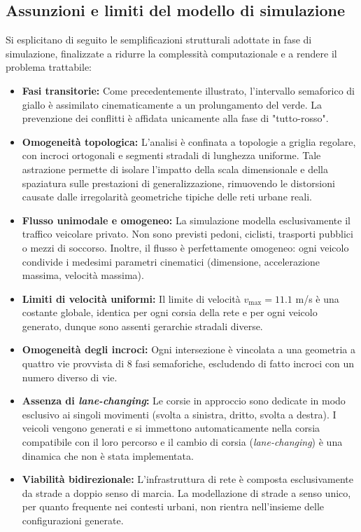 \subsection{Assunzioni e limiti del modello di simulazione}
\label{subsec:assunzioni-simulazione}
Si esplicitano di seguito le semplificazioni strutturali adottate in fase di simulazione, finalizzate a ridurre la complessità computazionale e a rendere il problema trattabile:
\begin{itemize}
  \item \textbf{Fasi transitorie:} Come precedentemente illustrato, l'intervallo semaforico di giallo è assimilato cinematicamente a un prolungamento del verde.
        La prevenzione dei conflitti è affidata unicamente alla fase di "tutto-rosso".
  \item \textbf{Omogeneità topologica:} L'analisi è confinata a topologie a griglia regolare, con incroci ortogonali e segmenti stradali di lunghezza uniforme.
        Tale astrazione permette di isolare l'impatto della scala dimensionale e della spaziatura sulle prestazioni di generalizzazione, rimuovendo le distorsioni causate dalle irregolarità geometriche tipiche delle reti urbane reali.
  \item \textbf{Flusso unimodale e omogeneo:} La simulazione modella esclusivamente il traffico veicolare privato. Non sono previsti pedoni, ciclisti, trasporti pubblici o mezzi di soccorso.
        Inoltre, il flusso è perfettamente omogeneo: ogni veicolo condivide i medesimi parametri cinematici (dimensione, accelerazione massima, velocità massima).
  \item \textbf{Limiti di velocità uniformi:} Il limite di velocità $v_{\max}=11.1$ m/s è una costante globale, identica per ogni corsia della rete e per ogni veicolo generato, dunque sono assenti gerarchie stradali diverse.
  \item \textbf{Omogeneità degli incroci:} Ogni intersezione è vincolata a una geometria a quattro vie provvista di 8 fasi semaforiche, escludendo di fatto incroci con un numero diverso di vie.
  \item \textbf{Assenza di \emph{lane-changing}:} Le corsie in approccio sono dedicate in modo esclusivo ai singoli movimenti (svolta a sinistra, dritto, svolta a destra).
        I veicoli vengono generati e si immettono automaticamente nella corsia compatibile con il loro percorso e il cambio di corsia (\emph{lane-changing}) è una dinamica che non è stata implementata.
  \item \textbf{Viabilità bidirezionale:} L'infrastruttura di rete è composta esclusivamente da strade a doppio senso di marcia.
        La modellazione di strade a senso unico, per quanto frequente nei contesti urbani, non rientra nell'insieme delle configurazioni generate.
\end{itemize}
